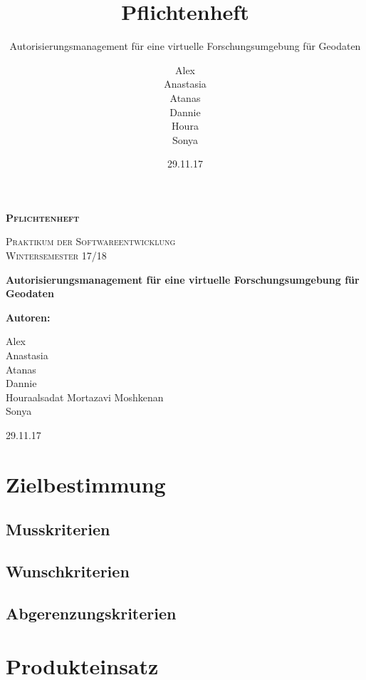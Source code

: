 \documentclass[parskip=full,11pt]{scrartcl}
\title{Pflichtenheft}
\subtitle{Autorisierungsmanagement für eine virtuelle Forschungsumgebung für Geodaten}
\author{Alex\\Anastasia\\Atanas\\Dannie\\ Houra\\Sonya\\}
\date{29.11.17}
\begin{document}
\begin{titlepage}
	
	\begin{center}
	{\scshape\LARGE\bfseries Pflichtenheft \par}
	\vspace{1cm}
	{\scshape\Large Praktikum der Softwareentwicklung\\}
	\vspace{1cm}
	{\scshape\Large Wintersemester 17/18\\}
	\vspace{3cm}
	{\huge\bfseries Autorisierungsmanagement für eine virtuelle Forschungsumgebung für Geodaten\par}
	\vspace{2cm}
	\vfill
	{\bfseries {\Large Autoren}:\par}
	{\Large Alex}\\%
	{\Large Anastasia}\\%
	{\Large Atanas}\\%
	{\Large Dannie}\\%
	{\Large Houraalsadat Mortazavi Moshkenan}\\
	{\Large Sonya}\\%
	\vfill
	{\large 29.11.17 \par}
	\end{center}
\end{titlepage}
\tableofcontents

\newpage
\section{Zielbestimmung}

\subsection{Musskriterien}
\subsection{Wunschkriterien}
\subsection{Abgerenzungskriterien}



\section{Produkteinsatz}
\end{document}
